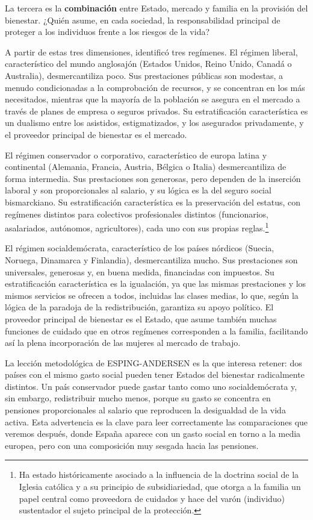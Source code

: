 \documentclass[10pt,a4paper]{article}
\begin{document}
La tercera es la \textbf{combinación} entre Estado, mercado y familia en la provisión del bienestar. ¿Quién asume, en cada sociedad, la responsabilidad principal de proteger a los individuos frente a los riesgos de la vida?

A partir de estas tres dimensiones, identificó tres regímenes. El régimen liberal, característico del mundo anglosajón (Estados Unidos, Reino Unido, Canadá o Australia), desmercantiliza poco. Sus prestaciones públicas son modestas, a menudo condicionadas a la comprobación de recursos, y se concentran en los más necesitados, mientras que la mayoría de la población se asegura en el mercado a través de planes de empresa o seguros privados. Su estratificación característica es un dualismo entre los asistidos, estigmatizados, y los asegurados privadamente, y el proveedor principal de bienestar es el mercado.

El régimen conservador o corporativo, característico de europa latina y continental (Alemania, Francia, Austria, Bélgica o Italia) desmercantiliza de forma intermedia. Sus prestaciones son generosas, pero dependen de la inserción laboral y son proporcionales al salario, y su lógica es la del seguro social bismarckiano. Su estratificación característica es la preservación del estatus, con regímenes distintos para colectivos profesionales distintos (funcionarios, asalariados, autónomos, agricultores), cada uno con sus propias reglas.\footnote{%
    Ha estado históricamente asociado a la influencia de la doctrina social de la Iglesia católica y a su principio de subsidiariedad, que otorga a la familia un papel central como proveedora de cuidados y hace del varón (individuo) sustentador el sujeto principal de la protección.
}

El régimen socialdemócrata, característico de los países nórdicos (Suecia, Noruega, Dinamarca y Finlandia), desmercantiliza mucho. Sus prestaciones son universales, generosas y, en buena medida, financiadas con impuestos. Su estratificación característica es la igualación, ya que las mismas prestaciones y los mismos servicios se ofrecen a todos, incluidas las clases medias, lo que, según la lógica de la paradoja de la redistribución, garantiza su apoyo político. El proveedor principal de bienestar es el Estado, que asume también muchas funciones de cuidado que en otros regímenes corresponden a la familia, facilitando así la plena incorporación de las mujeres al mercado de trabajo.

La lección metodológica de ESPING-ANDERSEN es la que interesa retener: dos países con el mismo gasto social pueden tener Estados del bienestar radicalmente distintos. Un país conservador puede gastar tanto como uno socialdemócrata y, sin embargo, redistribuir mucho menos, porque su gasto se concentra en pensiones proporcionales al salario que reproducen la desigualdad de la vida activa. Esta advertencia es la clave para leer correctamente las comparaciones que veremos después, donde España aparece con un gasto social en torno a la media europea, pero con una composición muy sesgada hacia las pensiones.
\end{document}
